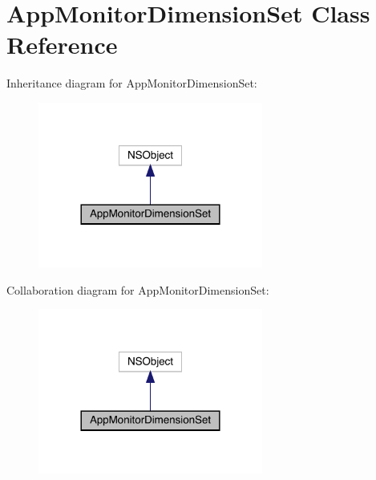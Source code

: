\hypertarget{interface_app_monitor_dimension_set}{}\section{App\+Monitor\+Dimension\+Set Class Reference}
\label{interface_app_monitor_dimension_set}


Inheritance diagram for App\+Monitor\+Dimension\+Set\+:\nopagebreak
\begin{figure}[H]
\begin{center}
\leavevmode
\includegraphics[width=209pt]{interface_app_monitor_dimension_set__inherit__graph}
\end{center}
\end{figure}


Collaboration diagram for App\+Monitor\+Dimension\+Set\+:\nopagebreak
\begin{figure}[H]
\begin{center}
\leavevmode
\includegraphics[width=209pt]{interface_app_monitor_dimension_set__coll__graph}
\end{center}
\end{figure}
